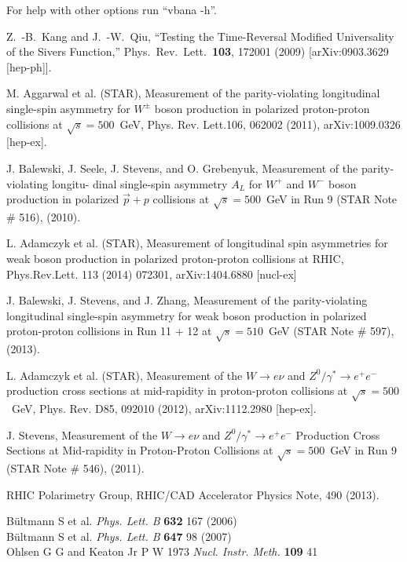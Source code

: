 \documentclass[12pt]{article}
\begin{document}
For help with other options run ``vbana -h''.

\newpage

\begin{thebibliography}{9}


  Z.~-B.~Kang and J.~-W.~Qiu,
  ``Testing the Time-Reversal Modified Universality of the Sivers Function,''
  Phys.\ Rev.\ Lett.\  {\bf 103}, 172001 (2009)
  [arXiv:0903.3629 [hep-ph]].

M. Aggarwal et al. (STAR), Measurement of the parity-violating longitudinal single-spin asymmetry
for $W^{\pm}$ boson production in polarized proton-proton collisions at $\sqrt{s} = 500$~GeV, 
Phys. Rev. Lett.106, 062002 (2011), 
arXiv:1009.0326 [hep-ex].

J. Balewski, J. Seele, J. Stevens, and O. Grebenyuk, Measurement of the parity-violating longitu-
dinal single-spin asymmetry $A_{L}$ for $W^{+}$ and $W^{-}$ boson production in polarized $\vec{p} + p$ collisions at
$\sqrt{s}=500$~GeV in Run 9 (STAR Note \# 516), (2010).

L. Adamczyk et al. (STAR), Measurement of longitudinal spin asymmetries for weak boson production in polarized proton-proton collisions at RHIC, 
Phys.Rev.Lett. 113 (2014) 072301, 
arXiv:1404.6880 [nucl-ex]

J. Balewski, J. Stevens, and J. Zhang, Measurement of the parity-violating longitudinal single-spin
asymmetry for weak boson production in polarized proton-proton collisions in Run 11 + 12 at
$\sqrt{s} = 510$~GeV (STAR Note \# 597), (2013).

L. Adamczyk et al. (STAR), Measurement of the $W\rightarrow e\nu$ and $Z^{0}/\gamma^{*}\rightarrow e^{+}e^{-}$ 
production cross sections at mid-rapidity in proton-proton collisions at
$\sqrt{s} = 500$~GeV, 
Phys. Rev. D85, 092010 (2012), 
arXiv:1112.2980 [hep-ex].

J. Stevens, Measurement of the $W\rightarrow e\nu$ and $Z^{0}/\gamma^{*}\rightarrow e^{+}e^{-}$  
Production Cross Sections at Mid-rapidity in Proton-Proton Collisions at
$\sqrt{s}=500$~GeV in Run 9 (STAR Note \# 546), (2011).

RHIC Polarimetry Group, RHIC/CAD Accelerator Physics Note, 490 (2013).

B\"{u}ltmann S et al. {\it Phys. Lett. B} {\bf 632} 167 (2006)\\
B\"{u}ltmann S et al. {\it Phys. Lett. B} {\bf 647} 98 (2007)\\
Ohlsen G G and Keaton Jr P W 1973 {\it Nucl. Instr. Meth.} {\bf 109} 41


\end{thebibliography}
\end{document}
